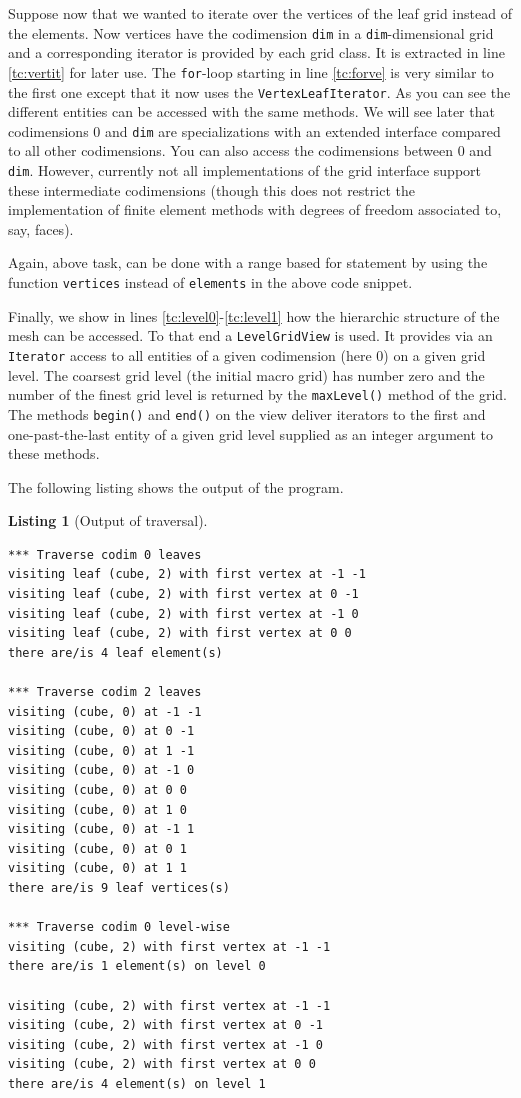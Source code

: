 \documentclass[11pt,a4paper,headinclude,footinclude,DIV16,headings=normal]{scrreprt}
\newtheorem{lst}{Listing}
\begin{document}
Suppose now that we wanted to iterate over the vertices of the leaf
grid instead of the elements. Now vertices have the codimension
\lstinline!dim! in a \lstinline!dim!-dimensional grid and a
corresponding iterator is provided by each grid class. It is extracted
in line \ref{tc:vertit} for later use. The \lstinline!for!-loop
starting in line \ref{tc:forve} is very similar to the first one
except that it now uses the \lstinline!VertexLeafIterator!.  As you
can see the different entities can be accessed with the same methods.
We will see later that codimensions 0 and \lstinline!dim! are
specializations with an extended interface compared to all other
codimensions. You can also access the codimensions between 0 and
\lstinline!dim!. However, currently not all implementations of the
grid interface support these intermediate codimensions (though this
does not restrict the implementation of finite element methods with
degrees of freedom associated to, say, faces).

Again, above task, can be done with a range based for statement by
using the function \lstinline!vertices! instead of \lstinline!elements!
in the above code snippet.

Finally, we show in lines \ref{tc:level0}-\ref{tc:level1} how the
hierarchic structure of the mesh can be accessed. To that end a
\lstinline!LevelGridView! is used. It provides via an \lstinline!Iterator!
access to all entities of a given codimension (here 0) on a given grid level.
The coarsest
grid level (the initial macro grid) has number zero and the number of
the finest grid level is returned by the \lstinline!maxLevel()! method
of the grid.  The methods \lstinline!begin()! and \lstinline!end()!
on the view deliver iterators to the first and one-past-the-last
entity of a given grid level supplied as an integer argument to these
methods.

The following listing shows the output of the program.

\begin{lst}[Output of traversal] \mbox{}

\begin{lstlisting}[basicstyle=\ttfamily\scriptsize]
*** Traverse codim 0 leaves
visiting leaf (cube, 2) with first vertex at -1 -1
visiting leaf (cube, 2) with first vertex at 0 -1
visiting leaf (cube, 2) with first vertex at -1 0
visiting leaf (cube, 2) with first vertex at 0 0
there are/is 4 leaf element(s)

*** Traverse codim 2 leaves
visiting (cube, 0) at -1 -1
visiting (cube, 0) at 0 -1
visiting (cube, 0) at 1 -1
visiting (cube, 0) at -1 0
visiting (cube, 0) at 0 0
visiting (cube, 0) at 1 0
visiting (cube, 0) at -1 1
visiting (cube, 0) at 0 1
visiting (cube, 0) at 1 1
there are/is 9 leaf vertices(s)

*** Traverse codim 0 level-wise
visiting (cube, 2) with first vertex at -1 -1
there are/is 1 element(s) on level 0

visiting (cube, 2) with first vertex at -1 -1
visiting (cube, 2) with first vertex at 0 -1
visiting (cube, 2) with first vertex at -1 0
visiting (cube, 2) with first vertex at 0 0
there are/is 4 element(s) on level 1
\end{lstlisting}
\end{lst}
\end{document}
